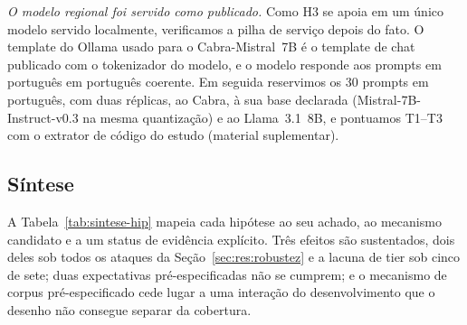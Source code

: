 \emph{O modelo regional foi servido como publicado.} Como H3 se apoia em um
único modelo servido localmente, verificamos a pilha de serviço depois do fato.
O template do Ollama usado para o Cabra-Mistral~7B é o template de chat
publicado com o tokenizador do modelo, e o modelo responde aos prompts em
português em português coerente. Em seguida reservimos os 30 prompts em
português, com duas réplicas, ao Cabra, à sua base declarada
(Mistral-7B-Instruct-v0.3 na mesma quantização) e ao Llama~3.1~8B, e pontuamos
T1--T3 com o extrator de código do estudo (material suplementar).
\ncabrasanitysentencept{}

\subsection{Síntese}
\label{sec:res:sintese}

A Tabela~\ref{tab:sintese-hip} mapeia cada hipótese ao seu achado, ao mecanismo
candidato e a um status de evidência explícito. Três efeitos são sustentados,
dois deles sob todos os ataques da Seção~\ref{sec:res:robustez} e a lacuna de
tier sob cinco de sete; duas expectativas pré-especificadas não se cumprem; e o
mecanismo de corpus pré-especificado cede lugar a uma interação do
desenvolvimento que o desenho não consegue separar da cobertura.

